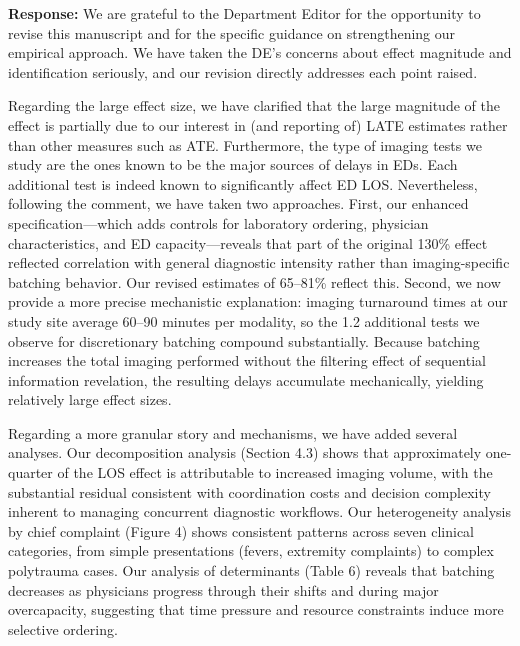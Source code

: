 \documentclass[11pt]{article}
\newcommand{\1}{\hbox{\rm 1\kern-.35em 1}}
\begin{document}
\noindent\textbf{Response:} \color{blue} We are grateful to the Department Editor for the opportunity to revise this manuscript and for the specific guidance on strengthening our empirical approach. We have taken the DE's concerns about effect magnitude and identification seriously, and our revision directly addresses each point raised.

Regarding the large effect size, we have clarified that the large magnitude of the effect is partially due to our interest in (and reporting of) LATE estimates rather than other measures such as ATE. Furthermore, the type of imaging tests we study are the ones known to be the major sources of delays in EDs. Each additional test is indeed known to significantly affect ED LOS. Nevertheless, following the comment, we have taken two approaches. First, our enhanced specification—which adds controls for laboratory ordering, physician characteristics, and ED capacity—reveals that part of the original 130\% effect reflected correlation with general diagnostic intensity rather than imaging-specific batching behavior. Our revised estimates of 65–81\% reflect this. Second, we now provide a more precise mechanistic explanation: imaging turnaround times at our study site average 60–90 minutes per modality, so the 1.2 additional tests we observe for discretionary batching compound substantially. Because batching increases the total imaging performed without the filtering effect of sequential information revelation, the resulting delays accumulate mechanically, yielding relatively large effect sizes.

Regarding a more granular story and mechanisms, we have added several analyses. Our decomposition analysis (Section 4.3) shows that approximately one-quarter of the LOS effect is attributable to increased imaging volume, with the substantial residual consistent with coordination costs and decision complexity inherent to managing concurrent diagnostic workflows. Our heterogeneity analysis by chief complaint (Figure 4) shows consistent patterns across seven clinical categories, from simple presentations (fevers, extremity complaints) to complex polytrauma cases. Our analysis of determinants (Table 6) reveals that batching decreases as physicians progress through their shifts and during major overcapacity, suggesting that time pressure and resource constraints induce more selective ordering.
\end{document}
